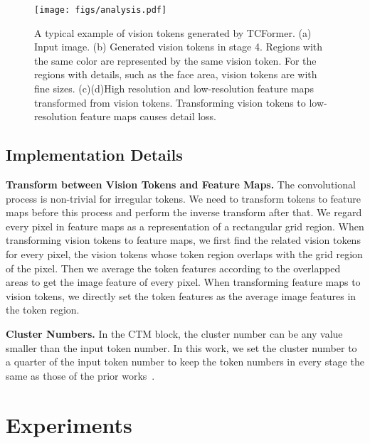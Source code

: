\documentclass[10pt,twocolumn,letterpaper]{article}
\begin{document}
\begin{figure}[t]
	\centering
	\texttt{[image: figs/analysis.pdf]}
	\vspace{-5mm}
	\caption{
	A typical example of vision tokens generated by TCFormer.
	(a) Input image. 
	(b) Generated vision tokens in stage 4. Regions with the same color are represented by the same vision token. For the regions with details, such as the face area,  vision tokens are with fine sizes.
    (c)(d)High resolution and low-resolution feature maps transformed from vision tokens.
	Transforming vision tokens to low-resolution feature maps causes detail loss. 
	}
	\vspace{-3mm}
	\label{fig:analysis}
\end{figure}




\subsection{Implementation Details}

\textbf{Transform between Vision Tokens and Feature Maps.}
The convolutional process is non-trivial for irregular tokens. We need to transform tokens to feature maps before this process and perform the inverse transform after that.
We regard every pixel in feature maps as a representation of a rectangular grid region. 
When transforming vision tokens to feature maps, we first find the related vision tokens for every pixel, \ie the vision tokens whose token region overlaps with the grid region of the pixel. Then we average the token features according to the overlapped areas to get the image feature of every pixel.
When transforming feature maps to vision tokens, we directly set the token features as the average image features in the token region.

\textbf{Cluster Numbers.}
In the CTM block, the cluster number can be any value smaller than the input token number. 
In this work, we set the cluster number to a quarter of the input token number to keep the token numbers in every stage the same as those of the prior works~\cite{pvt,swin}.
 
\section{Experiments}
\end{document}
